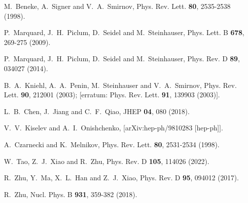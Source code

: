 \documentclass[onecolumn,preprintnumbers,aps,superscriptaddress,nofootinbib,prd,notitlepage]{revtex4-1}
\begin{document}
{\begin{thebibliography}{99}
M.~Beneke, A.~Signer and V.~A.~Smirnov,
Phys. Rev. Lett. \textbf{80}, 2535-2538 (1998).

P.~Marquard, J.~H.~Piclum, D.~Seidel and M.~Steinhauser,
Phys. Lett. B \textbf{678}, 269-275 (2009).

P.~Marquard, J.~H.~Piclum, D.~Seidel and M.~Steinhauser,
Phys. Rev. D \textbf{89},  034027 (2014).

B.~A.~Kniehl, A.~A.~Penin, M.~Steinhauser and V.~A.~Smirnov,
Phys. Rev. Lett. \textbf{90}, 212001 (2003); [erratum: Phys. Rev. Lett. \textbf{91}, 139903 (2003)].

L.~B.~Chen, J.~Jiang and C.~F.~Qiao,
JHEP \textbf{04}, 080 (2018).


V.~V.~Kiselev and A.~I.~Onishchenko,
[arXiv:hep-ph/9810283 [hep-ph]].

A.~Czarnecki and K.~Melnikov,
Phys. Rev. Lett. \textbf{80}, 2531-2534 (1998).

W.~Tao, Z.~J.~Xiao and R.~Zhu,
Phys. Rev. D \textbf{105}, 114026 (2022).

R.~Zhu, Y.~Ma, X.~L.~Han and Z.~J.~Xiao,
Phys. Rev. D \textbf{95}, 094012 (2017).

R.~Zhu,
Nucl. Phys. B \textbf{931}, 359-382 (2018).


\end{thebibliography}}
\end{document}
